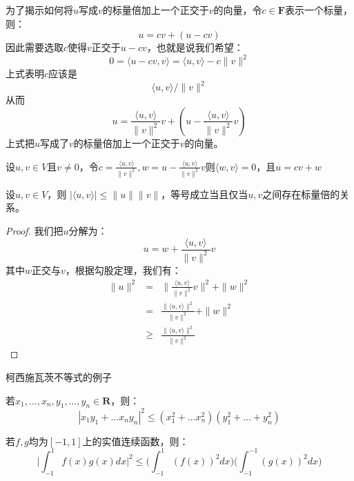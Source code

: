\documentclass[10pt,a4paper,UTF8]{article}
\begin{document}
为了揭示如何将\(u\)写成\(v\)的标量倍加上一个正交于\(v\)的向量，令\(c\in \mathbf{F}\)表示一个标量，则：
\[u = cv + (u-cv)\]
因此需要选取\(c\)使得\(v\)正交于\(u-cv\)，也就是说我们希望：
\[0 = \langle u-cv,v \rangle  = \langle u,v \rangle - c \| v \|^{2}  \]
上式表明\(c\)应该是\[\langle u,v \rangle / \| v \|^{2}  \] 从而
\[ u =  \frac{\langle u,v \rangle  }{\| v \|^{2} }v + (u - \frac{\langle u,v \rangle  }{\| v \|^{2} } v) \]
上式把\(u\)写成了\(v\)的标量倍加上一个正交于\(v\)的向量。
\begin{theorem}
设\(u,v\in V\)且\(v\neq 0\)，令\(c = \frac{\langle u,v \rangle  }{\| v \|^{2} }, w = u - \frac{\langle u,v \rangle  }{\| v \|^{2} } v\)则\(\langle w,v \rangle = 0\)，且\(u = cv + w\)
\end{theorem}

\begin{theorem}
设\(u,v\in V\)，则 \(| \langle u,v \rangle  | \leq \| u \| \| v \|\)，等号成立当且仅当\(u,v\)之间存在标量倍的关系。
\end{theorem}

\begin{proof}
我们把\(u\)分解为：
\[u = w + \frac{\langle u,v \rangle  }{\| v \|^{2} } v\]
其中\(w\)正交与\(v\)，根据勾股定理，我们有：
\begin{eqnarray}
\label{eq:11}
\| u \|^{2} &=& \bigg\| \frac{\langle u,v \rangle  }{\| v \|^{2} } v \bigg\|^{2}  + \| w \|^{2} \\
&=& \frac{ \|\langle u,v \rangle \|^{2}  }{\| v \|^{2} }  + \| w \|^{2} \\
&\geq & \frac{ \|\langle u,v \rangle \|^{2}  }{\| v \|^{2} }
\end{eqnarray}
\end{proof}
柯西施瓦茨不等式的例子
\begin{instance}
若\(x_{1},\ldots ,x_{n},y_{1},\ldots ,y_{n}\in \mathbf{R}\)，则：
\begin{equation}
\label{eq:12}
|x_1y_1 + \ldots x_ny_n|^2 \leq (x_1^2 + \ldots x_n^2)(y_1^2 + \ldots + y_n^2)
\end{equation}
\end{instance}
\begin{instance}
若\(f,g\)均为\([-1,1]\)上的实值连续函数，则：
\begin{equation}
\label{eq:13}
\bigg\vert \int_{-1}^{1}f(x)g(x)dx \bigg\vert^{2} \leq \bigg(\int_{-1}^{1} (f(x))^{2}dx\bigg) \bigg(\int_{-1}^{-1} (g(x))^{2}dx\bigg)
\end{equation}
\end{instance}
\end{document}
